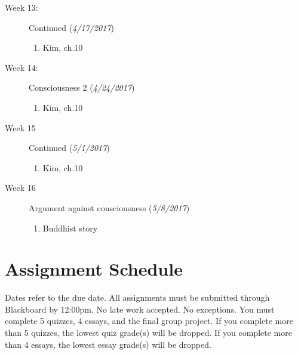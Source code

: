 \documentclass[article,oneside]{memoir}
\begin{document}
\begin{description}
\item[Week 13:] Continued  (\emph{4/17/2017})
\begin{enumerate}
\item Kim, ch.10
\end{enumerate}

\item[Week 14:] Consciousness 2  (\emph{4/24/2017})
\begin{enumerate}
\item Kim, ch.10
\end{enumerate}


\item[Week 15]  Continued  (\emph{5/1/2017})
\begin{enumerate}
\item  Kim, ch.10
\end{enumerate}

\item[Week 16]  Argument against consciousness  (\emph{5/8/2017})
\begin{enumerate}
\item Buddhist story
\end{enumerate}



\end{description}





\section{ Assignment Schedule}
Dates refer to the due date. All assignments must be submitted through Blackboard by 12:00pm. No late work accepted. No exceptions. You must complete 5 quizzes, 4 essays, and the final group project.  If you complete more than 5 quizzes, the lowest quiz grade(s) will be dropped. If you complete more than 4 essays, the lowest essay grade(s) will be dropped. 
\end{document}

